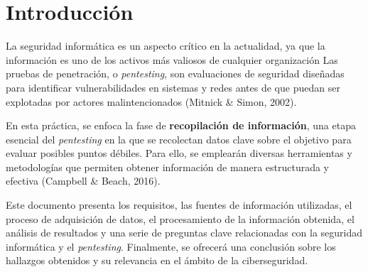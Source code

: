 \section{Introducción}

La seguridad informática es un aspecto crítico en la actualidad, ya que la información es uno de los activos más valiosos de cualquier organización
Las pruebas de penetración, o \textit{pentesting}, son evaluaciones de seguridad diseñadas para identificar vulnerabilidades en sistemas y redes antes de que puedan ser explotadas por actores malintencionados (Mitnick \& Simon, 2002).

En esta práctica, se enfoca la fase de \textbf{recopilación de información}, una etapa esencial del \textit{pentesting} en la que se recolectan datos clave sobre el objetivo para evaluar posibles puntos débiles. 
Para ello, se emplearán diversas herramientas y metodologías que permiten obtener información de manera estructurada y efectiva (Campbell \& Beach, 2016).

Este documento presenta los requisitos, las fuentes de información utilizadas, el proceso de adquisición de datos, el procesamiento de la información obtenida, el análisis de resultados y una serie de preguntas clave relacionadas con la seguridad informática y el \textit{pentesting}. 
Finalmente, se ofrecerá una conclusión sobre los hallazgos obtenidos y su relevancia en el ámbito de la ciberseguridad.



